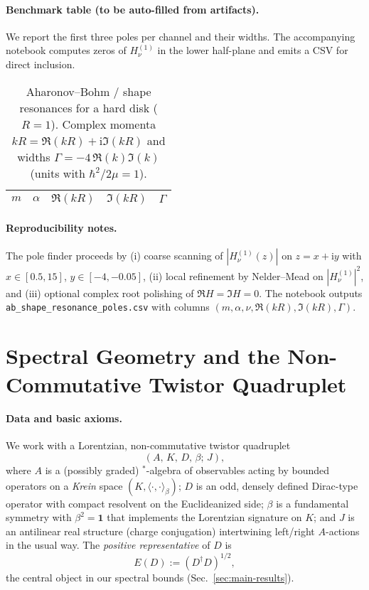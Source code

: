 \documentclass[11pt]{article}
\theoremstyle{definition}
\begin{document}
    \paragraph{Benchmark table (to be auto-filled from artifacts).}
    We report the first three poles per channel and their widths.
    The accompanying notebook computes zeros of $H^{(1)}_{\nu}$ in the lower half-plane and emits a CSV for direct inclusion.
    
    \begin{table}[t]
    	\centering
    	\caption{Aharonov--Bohm / shape resonances for a hard disk ($R=1$).
    		Complex momenta $kR=\Re(kR)+\mathrm{i}\Im(kR)$ and widths $\Gamma=-4\,\Re(k)\Im(k)$ (units with $\hbar^2/2\mu=1$).}
    	\label{tab:ab-benchmark}
    	\begin{tabular}{c c c c c}
    		\toprule
    		$m$ & $\alpha$ & $\Re(kR)$ & $\Im(kR)$ & $\Gamma$ \\
    		\midrule
    		
\bottomrule
    	\end{tabular}
    \end{table}
    
    \paragraph{Reproducibility notes.}
    The pole finder proceeds by (i) coarse scanning of $|H^{(1)}_{\nu}(z)|$ on $z=x+\mathrm{i}y$ with $x\in[0.5,15]$, $y\in[-4,-0.05]$,
    (ii) local refinement by Nelder--Mead on $|H^{(1)}_{\nu}|^2$, and (iii) optional complex root polishing of $\Re H=\Im H=0$.
    The notebook outputs \texttt{ab\_shape\_resonance\_poles.csv} with columns $(m,\alpha,\nu,\Re(kR),\Im(kR),\Gamma)$.
    
    
    \section{Spectral Geometry and the Non-Commutative Twistor Quadruplet}
    \label{sec:twistor-quadruplet}
    
    \paragraph{Data and basic axioms.}
    We work with a Lorentzian, non-commutative twistor quadruplet
    \[
    (A,\,K,\,D,\,\beta;\,J),
    \]
    where $A$ is a (possibly graded) $^\ast$-algebra of observables acting by bounded operators on a \emph{Krein} space $(K,\langle\cdot,\cdot\rangle_\beta)$; $D$ is an odd, densely defined Dirac-type operator with compact resolvent on the Euclideanized side; $\beta$ is a fundamental symmetry with $\beta^2=\mathbf{1}$ that implements the Lorentzian signature on $K$; and $J$ is an antilinear real structure (charge conjugation) intertwining left/right $A$-actions in the usual way. The \emph{positive representative} of $D$ is
    \[
    E(D):=(D^\dagger D)^{1/2}\!,
    \]
    the central object in our spectral bounds (Sec.~\ref{sec:main-results}).
    
\end{document}
